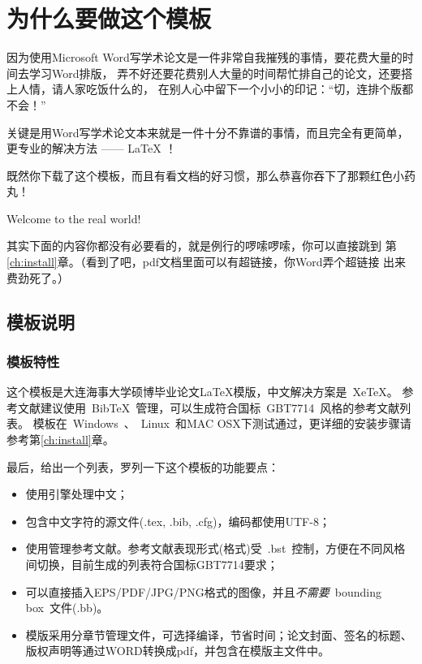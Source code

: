 \chapter{为什么要做这个模板}\label{ch:intr}

因为使用Microsoft 
Word写学术论文是一件非常自我摧残的事情，要花费大量的时间去学习Word排版，
弄不好还要花费别人大量的时间帮忙排自己的论文，还要搭上人情，请人家吃饭什么的，
在别人心中留下一个小小的印记：“切，连排个版都不会！”

{\xiaoerhao 关键是用Word写学术论文本来就是一件十分{\color{red}不}靠谱的事情，而且完全有更简单，更专业的解决方法 —— {\color{blue}\LaTeX} ！}

既然你下载了这个模板，而且有看文档的好习惯，那么恭喜你吞下了那颗红色小药丸！

Welcome to the real world!

其实下面的内容你都没有必要看的，就是例行的啰嗦啰嗦，你可以直接跳到
第\ref{ch:install}章。（看到了吧，pdf文档里面可以有超链接，你Word弄个超链接
出来费劲死了。）

\section{模板说明}
\label{sec:fastguide}

\subsection{模板特性}
\label{sec:features}

这个模板是大连海事大学硕博毕业论文\LaTeX{}模版，中文解决方案是~Xe\TeX{}。
参考文献建议使用~BibTeX~管理，可以生成符合国标~GBT7714~风格的参考文献列表。
模板在~Windows~、~Linux~和MAC OSX下测试通过，更详细的安装步骤请参考第\ref{ch:install}章。


最后，给出一个列表，罗列一下这个模板的功能要点：

\begin{itemize}
\item 使用\XeTeX 引擎处理中文；
\item 包含中文字符的源文件(.tex, .bib, .cfg)，编码都使用UTF-8；
\item 使用\BibTeX 管理参考文献。参考文献表现形式(格式)受~.bst~控制，方便在不同风格间切换\cite{Schmidt,Schneider2010,Sha2003,Shan2010,Wang2010}，目前生成的列表符合国标GBT7714要求；
\item 可以直接插入EPS/PDF/JPG/PNG格式的图像，并且\emph{不需要}~bounding box~文件(.bb)。
\item 模版采用分章节管理文件，可选择编译，节省时间；论文封面、签名的标题、版权声明等通过WORD转换成pdf，并包含在模版主文件中。

\end{itemize}

